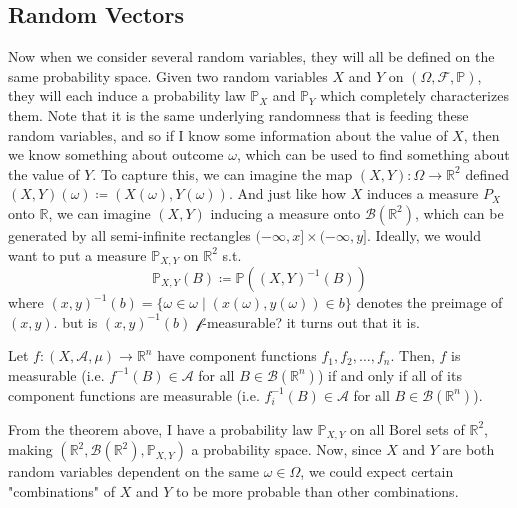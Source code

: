 \documentclass{article}
\begin{document}
  \subsection{Random Vectors}

    Now when we consider several random variables, they will all be defined on the same probability space. Given two random variables $X$ and $Y$ on $(\Omega, \mathcal{F}, \mathbb{P})$, they will each induce a probability law $\mathbb{P}_X$ and $\mathbb{P}_Y$ which completely characterizes them. Note that it is the same underlying randomness that is feeding these random variables, and so if I know some information about the value of $X$, then we know something about outcome $\omega$, which can be used to find something about the value of $Y$. To capture this, we can imagine the map $(X, Y) : \Omega \longrightarrow \mathbb{R}^2$ defined $(X, Y)(\omega) \coloneqq (X(\omega), Y(\omega))$. And just like how $X$ induces a measure $P_X$ onto $\mathbb{R}$, we can imagine $(X, Y)$ inducing a measure onto $\mathcal{B}(\mathbb{R}^2)$, which can be generated by all semi-infinite rectangles $(-\infty, x] \times (-\infty, y]$. Ideally, we would want to put a measure $\mathbb{P}_{X, Y}$ on $\mathbb{R}^2$ s.t. 
    \begin{equation}
      \mathbb{P}_{X, Y}(B) \coloneqq \mathbb{P}((X, Y)^{-1}(B))
    \end{equation}
    where $(x, y)^{-1}(b) = \{ \omega \in \omega \mid (x(\omega), y(\omega)) \in b\}$ denotes the preimage of $(x, y)$. but is $(x, y)^{-1}(b)$ $\mathcal{f}$-measurable? it turns out that it is. 

    \begin{theorem}
      Let $f: (X, \mathcal{A}, \mu) \longrightarrow \mathbb{R}^n$ have component functions $f_1, f_2, \ldots, f_n$. Then, $f$ is measurable (i.e. $f^{-1} (B) \in \mathcal{A}$ for all $B \in \mathcal{B}(\mathbb{R}^n)$) if and only if all of its component functions are measurable (i.e. $f_i^{-1} (B) \in \mathcal{A}$ for all $B \in \mathcal{B}(\mathbb{R}^n)$). 
    \end{theorem}

    From the theorem above, I have a probability law $\mathbb{P}_{X, Y}$ on all Borel sets of $\mathbb{R}^2$, making $(\mathbb{R}^2, \mathcal{B}(\mathbb{R}^2), \mathbb{P}_{X, Y})$ a probability space. Now, since $X$ and $Y$ are both random variables dependent on the same $\omega \in \Omega$, we could expect certain "combinations" of $X$ and $Y$ to be more probable than other combinations. 
\end{document}
